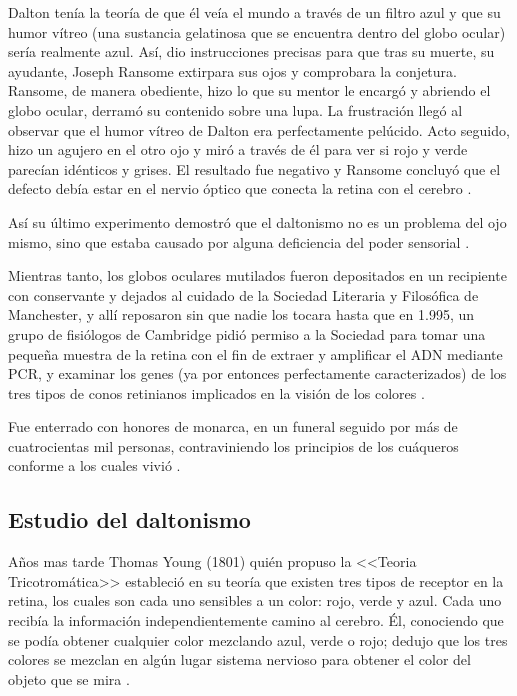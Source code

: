 \documentclass[10pt]{article}
\begin{document}
Dalton tenía la teoría de que él veía el mundo a través de un filtro azul y que su humor vítreo (una sustancia gelatinosa que se encuentra dentro del globo ocular) sería realmente azul. Así, dio instrucciones precisas para que tras su muerte, su ayudante, Joseph Ransome extirpara sus ojos y comprobara la conjetura. Ransome, de manera obediente, hizo lo que su mentor le encargó y abriendo el globo ocular, derramó su contenido sobre una lupa. La frustración llegó al observar que el humor vítreo de Dalton era perfectamente pelúcido. Acto seguido, hizo un agujero en el otro ojo y miró a través de él para ver si rojo y verde parecían idénticos y grises. El resultado fue negativo y Ransome concluyó que el defecto debía estar en el nervio óptico que conecta la retina con el cerebro \cite{IEEEreferencias:Ref3}.

\setlength{\parskip}{2mm}

Así su último experimento demostró que el daltonismo no es un problema del ojo mismo, sino que estaba causado por alguna deficiencia del poder sensorial \cite{IEEEreferencias:Ref1}.

\setlength{\parskip}{2mm}

Mientras tanto, los globos oculares mutilados fueron depositados en un recipiente con conservante y dejados al cuidado de la Sociedad Literaria y Filosófica de Manchester, y allí reposaron sin que nadie los tocara hasta que en 1.995, un grupo de fisiólogos de Cambridge pidió permiso a la Sociedad para tomar una pequeña muestra de la retina con el fin de extraer y amplificar el ADN mediante PCR, y examinar los genes (ya por entonces perfectamente caracterizados) de los tres tipos de conos retinianos implicados en la visión de los colores \cite{IEEEreferencias:Ref3}.

\setlength{\parskip}{2mm}

Fue enterrado con honores de monarca, en un funeral seguido por más de cuatrocientas mil personas, contraviniendo los principios de los cuáqueros conforme a los cuales vivió \cite{IEEEreferencias:Ref1}. 

\subsection{Estudio del daltonismo}

Años mas tarde Thomas Young (1801) quién propuso la <<Teoria Tricotromática>> estableció en su teoría que existen tres tipos de receptor en la retina, los cuales son cada uno sensibles a un color: rojo, verde y azul. Cada uno recibía la información independientemente camino al cerebro. Él, conociendo que se podía obtener cualquier color mezclando azul, verde o rojo; dedujo que los tres colores se mezclan en algún lugar sistema nervioso para obtener el color del objeto que se mira \cite{IEEEreferencias:Ref4}.
\end{document}
